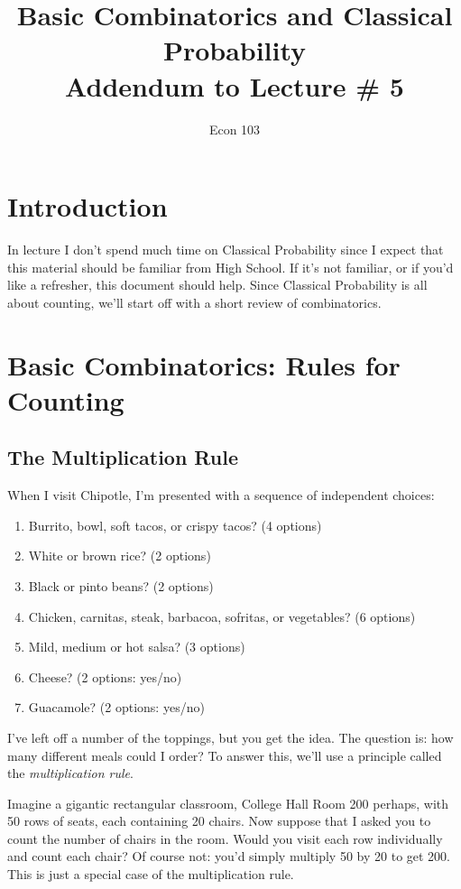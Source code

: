 \documentclass[12pt]{article}
\title{Basic Combinatorics and Classical Probability\\ \large Addendum to Lecture \# 5}
\author{Econ 103}
\begin{document}
\maketitle

\section*{Introduction}
In lecture I don't spend much time on Classical Probability since I expect that this material should be familiar from High School.
If it's not familiar, or if you'd like a refresher, this document should help.
Since Classical Probability is all about counting, we'll start off with a short review of combinatorics.

\section*{Basic Combinatorics: Rules for Counting}
\subsection*{The Multiplication Rule}
When I visit Chipotle, I'm presented with a sequence of independent choices:
\begin{enumerate}
  \item Burrito, bowl, soft tacos, or crispy tacos? (4 options)
  \item White or brown rice? (2 options)
  \item Black or pinto beans? (2 options)
  \item Chicken, carnitas, steak, barbacoa, sofritas, or vegetables? (6 options) 
  \item Mild, medium or hot salsa? (3 options)
  \item Cheese? (2 options: yes/no)
  \item Guacamole? (2 options: yes/no)
\end{enumerate}
I've left off a number of the toppings, but you get the idea.
The question is: how many different meals could I order?
To answer this, we'll use a principle called the \emph{multiplication rule}.

Imagine a gigantic rectangular classroom, College Hall Room 200 perhaps, with 50 rows of seats, each containing 20 chairs.
Now suppose that I asked you to count the number of chairs in the room.
Would you visit each row individually and count each chair? 
Of course not: you'd simply multiply 50 by 20 to get 200.
This is just a special case of the multiplication rule.
\end{document}
